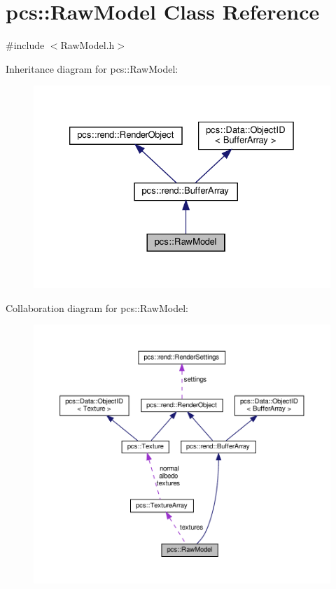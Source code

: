 \hypertarget{classpcs_1_1RawModel}{}\section{pcs\+:\+:Raw\+Model Class Reference}
\label{classpcs_1_1RawModel}


{\ttfamily \#include $<$Raw\+Model.\+h$>$}



Inheritance diagram for pcs\+:\+:Raw\+Model\+:\nopagebreak
\begin{figure}[H]
\begin{center}
\leavevmode
\includegraphics[width=326pt]{classpcs_1_1RawModel__inherit__graph}
\end{center}
\end{figure}


Collaboration diagram for pcs\+:\+:Raw\+Model\+:\nopagebreak
\begin{figure}[H]
\begin{center}
\leavevmode
\includegraphics[width=350pt]{classpcs_1_1RawModel__coll__graph}
\end{center}
\end{figure}
